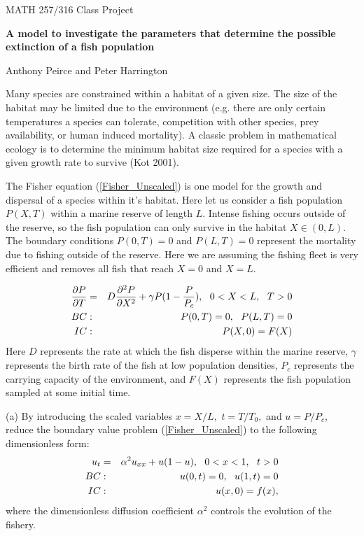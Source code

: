 \documentclass[12pt]{article}
\begin{document}
\pagestyle{empty}

\begin{center}
{\Large MATH 257/316 Class Project}\textbf{\ \\[0pt]
}



\textbf{A model to investigate the parameters that determine the possible
extinction of a fish population}

Anthony Peirce and Peter Harrington
\end{center}


Many species are constrained within a habitat of a given size. The size of the habitat may be limited due to the environment (e.g. there are only certain temperatures a species can tolerate, competition with other species, prey availability, or human induced mortality). A classic problem in mathematical ecology is to determine the minimum habitat size required for a species with a given growth rate to survive (Kot 2001).


The Fisher equation (\ref{Fisher_Unscaled}) is one model for the growth and dispersal of a species within it's habitat. Here let us consider a fish population $P(X,T)$ within a marine reserve of length $L$. Intense fishing occurs outside of the reserve, so the fish population can only survive in the habitat $X\in (0,L)$. The boundary conditions $P(0,T)=0$ and $P(L,T)=0$ represent the mortality due to fishing outside of the reserve. Here we are assuming the fishing fleet is very efficient and removes all fish that reach $X=0$ and $X=L$.


\begin{eqnarray}
\frac{\partial P}{\partial T} &=&D\frac{\partial ^{2}P}{\partial X^{2}}%
+\gamma P(1-\frac{P}{P_c}),~~0<X<L,~~T>0  \label{Fisher_Unscaled} \\
BC &:&P(0,T)=0,\text{ \ }P(L,T)=0  \notag \\
IC &:&P(X,0)=F(X)  \notag
\end{eqnarray}%
Here $D$ represents the rate at which the fish disperse within the marine reserve, $\gamma $ represents the birth rate of the fish at low population densities, $P_c$ represents the carrying capacity of the environment, and $F(X)$ represents the fish population sampled at some initial time.

(a) By introducing the scaled variables $x=X/L,$ $t=T/T_{0},$ and $%
u=P/P_c, $ reduce the boundary value problem (\ref{Fisher_Unscaled}) to
the following dimensionless form: 
\begin{eqnarray}
u_{t} &=&\alpha ^{2}u_{xx}+u(1-u),~~0<x<1,~~t>0  \label{Fisher} \\
BC &:&u(0,t)=0,\text{ \ }u(1,t)=0  \notag \\
IC &:&u(x,0)=f(x),  \notag
\end{eqnarray}%
where the dimensionless diffusion coefficient $\alpha ^{2}$ controls the
evolution of the fishery.
\end{document}
